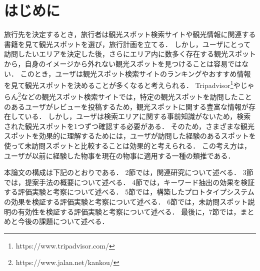 \documentclass[submit,techrep,noauthor]{ipsj}
\begin{document}
\section{はじめに}

旅行先を決定するとき，旅行者は観光スポット検索サイトや観光情報に関連する書籍を見て観光スポットを選び，旅行計画を立てる．
しかし，ユーザにとって訪問したいエリアを決定した後，さらにエリア内に数多く存在する観光スポットから，自身のイメージから外れない観光スポットを見つけることは容易ではない．
このとき，ユーザは観光スポット検索サイトのランキングやおすすめ情報を見て観光スポットを決めることが多くなると考えられる．
Tripadvisor\footnote{https://www.tripadvisor.com/}やじゃらん\footnote{https://www.jalan.net/kankou/}などの観光スポット検索サイトでは，特定の観光スポットを訪問したことのあるユーザがレビューを投稿するため，観光スポットに関する豊富な情報が存在している．
しかし，ユーザは検索エリアに関する事前知識がないため，検索された観光スポットを1つずつ確認する必要がある．
そのため，さまざまな観光スポットを効果的に理解するためには，ユーザが訪問した経験のあるスポットを使って未訪問スポットと比較することは効果的と考えられる．
この考え方は，ユーザが以前に経験した物事を現在の物事に適用する一種の類推である．


本論文の構成は下記のとおりである．
2節では，関連研究について述べる．
3節では，提案手法の概要について述べる．
4節では，キーワード抽出の効果を検証する評価実験と考察について述べる．
5節では，構築したプロトタイプシステムの効果を検証する評価実験と考察について述べる．
6節では，未訪問スポット説明の有効性を検証する評価実験と考察について述べる．
最後に，7節では，まとめと今後の課題について述べる．
\end{document}
